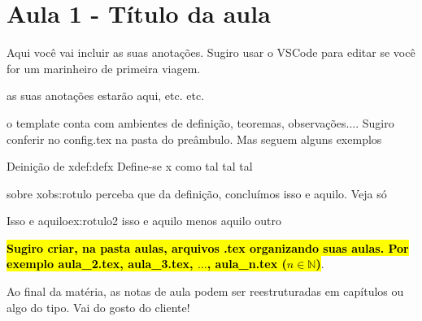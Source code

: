 
\newpage
\pagestyle{fancy}
\setcounter{page}{3} %

\section{Aula 1 - Título da aula}
\hspace{0.5cm}Aqui você vai incluir as suas anotações. Sugiro usar o VSCode para editar se você for um marinheiro de primeira viagem.

as suas anotações estarão aqui, etc. etc.

o template conta com ambientes de definição, teoremas, observações.... Sugiro conferir no config.tex na pasta do preâmbulo. Mas seguem alguns exemplos

\begin{definicao}{Deinição de x}{def:defx}
	Define-se x como tal tal tal
\end{definicao}

\begin{observacao}{sobre x}{obs:rotulo}
	perceba que da definição, concluímos isso e aquilo. Veja só
	\begin{exemplo}{Isso e aquilo}{ex:rotulo2}
		isso e aquilo menos aquilo outro
	\end{exemplo}
\end{observacao}

\hl{\textbf{Sugiro criar, na pasta aulas, arquivos .tex organizando suas aulas. Por exemplo aula\_2.tex, aula\_3.tex, $ \dots $, aula\_n.tex ($ n \in \mathbb{N} $)}}.

Ao final da matéria, as notas de aula podem ser reestruturadas em capítulos ou algo do tipo. Vai do gosto do cliente!